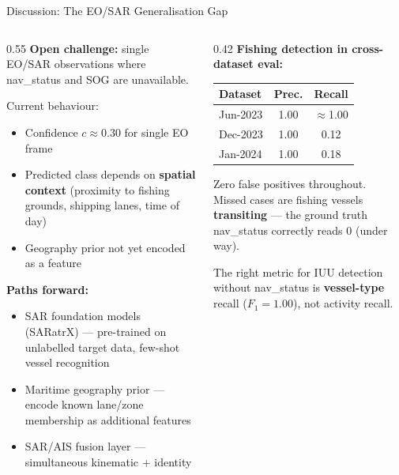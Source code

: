 \documentclass[aspectratio=169,10pt]{beamer}
\begin{document}
\begin{frame}{Discussion: The EO/SAR Generalisation Gap}
  \begin{columns}[T]
    \begin{column}{0.55\textwidth}
      \textbf{Open challenge:} single EO/SAR observations where
      nav\_status and SOG are unavailable.

      \bigskip
      Current behaviour:
      \begin{itemize}
        \item Confidence $c \approx 0.30$ for single EO frame
        \item Predicted class depends on \textbf{spatial context}
              (proximity to fishing grounds, shipping lanes, time of day)
        \item Geography prior not yet encoded as a feature
      \end{itemize}

      \bigskip
      \textbf{Paths forward:}
      \begin{itemize}
        \item SAR foundation models (SARatrX) — pre-trained on
              unlabelled target data, few-shot vessel recognition
        \item Maritime geography prior — encode known lane/zone
              membership as additional features
        \item SAR/AIS fusion layer — simultaneous kinematic + identity
      \end{itemize}
    \end{column}
    \begin{column}{0.42\textwidth}
      \textbf{Fishing detection in cross-dataset eval:}

      \medskip
      \begin{tabular}{lcc}
        \toprule
        Dataset & Prec. & Recall \\
        \midrule
        Jun-2023  & 1.00  & $\approx$1.00 \\
        Dec-2023  & 1.00  & 0.12 \\
        Jan-2024  & 1.00  & 0.18 \\
        \bottomrule
      \end{tabular}

      \medskip
      Zero false positives throughout.\\
      Missed cases are fishing vessels \textbf{transiting} — the ground
      truth nav\_status correctly reads 0 (under way).

      \medskip
      The right metric for IUU detection without nav\_status is
      \textbf{vessel-type} recall ($F_1 = 1.00$), not activity recall.
    \end{column}
  \end{columns}
\end{frame}
\end{document}
